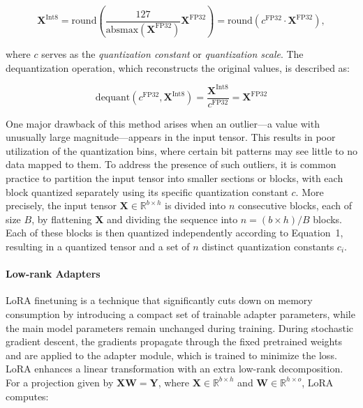 \begin{equation}
    \mathbf{X}^{ \text{Int8}} = \text{round}\left( \frac{127}{{\text{absmax}}(\mathbf{X}^{{\text{FP32}}})}\mathbf{X}^{{\text{FP32}}} \right) = \text{round}(c^{\text{FP32}}\cdot \mathbf{X}^{{\text{FP32}}}),
\end{equation}

where $c$ serves as the {\em quantization constant} or {\em quantization scale}. The dequantization operation, which reconstructs the original values, is described as:

\begin{equation}
    \text{dequant}(c^{\text{FP32}}, \mathbf{X}^{\text{Int8}}) = \frac{\mathbf{X}^{\text{Int8}}}{c^{\text{FP32}}} = \mathbf{X}^{\text{FP32}}
\end{equation}

One major drawback of this method arises when an outlier—a value with unusually large magnitude—appears in the input tensor. This results in poor utilization of the quantization bins, where certain bit patterns may see little to no data mapped to them. To address the presence of such outliers, it is common practice to partition the input tensor into smaller sections or blocks, with each block quantized separately using its specific quantization constant $c$. More precisely, the input tensor $\mathbf{X}\in \mathbb{R}^{b\times h}$ is divided into $n$ consecutive blocks, each of size $B$, by flattening $\mathbf{X}$ and dividing the sequence into ${n = ({b\times h})/{B}}$ blocks. Each of these blocks is then quantized independently according to Equation~1, resulting in a quantized tensor and a set of $n$ distinct quantization constants $c_i$.

\paragraph{Low-rank Adapters} LoRA finetuning \citep{hu2021lora} is a technique that significantly cuts down on memory consumption by introducing a compact set of trainable adapter parameters, while the main model parameters remain unchanged during training. During stochastic gradient descent, the gradients propagate through the fixed pretrained weights and are applied to the adapter module, which is trained to minimize the loss. LoRA enhances a linear transformation with an extra low-rank decomposition. For a projection given by ${\mathbf{X} \mathbf{W} = \mathbf{Y}}$, where $\mathbf{X}\in  \mathbb{R}^{b\times h}$ and $\mathbf{W}\in  \mathbb{R}^{h\times o}$, LoRA computes:


